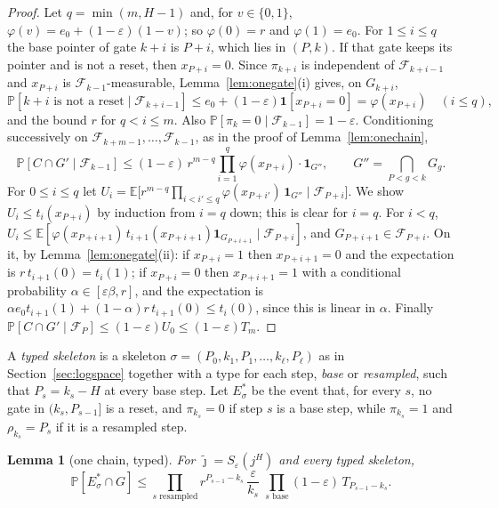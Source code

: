 \documentclass[11pt]{amsart}
\newtheorem{lemma}[theorem]{Lemma}
\theoremstyle{definition}
\theoremstyle{remark}
\newcommand{\eps}{\varepsilon}
\newcommand{\jt}{\tilde{\jmath}}
\newcommand{\PP}{\mathbb{P}}
\newcommand{\EE}{\mathbb{E}}
\newcommand{\cF}{\mathcal{F}}
\begin{document}
\begin{proof}
Let $q=\min(m,H-1)$ and, for $v\in\{0,1\}$, $\varphi(v)=e_0+(1-\eps)(1-v)$; so $\varphi(0)=r$ and
$\varphi(1)=e_0$. For $1\le i\le q$ the base pointer of gate $k+i$ is $P+i$, which lies in $(P,k)$.
If that gate keeps its pointer and is not a reset, then $x_{P+i}=0$. Since $\pi_{k+i}$ is independent
of $\cF_{k+i-1}$ and $x_{P+i}$ is $\cF_{k-1}$-measurable, Lemma~\ref{lem:onegate}(i) gives, on
$G_{k+i}$,
\[
\PP[k+i\text{ is not a reset}\mid\cF_{k+i-1}]\le e_0+(1-\eps)\mathbf 1[x_{P+i}=0]=\varphi(x_{P+i})\quad(i\le q),
\]
and the bound $r$ for $q<i\le m$. Also $\PP[\pi_k=0\mid\cF_{k-1}]=1-\eps$. Conditioning
successively on $\cF_{k+m-1},\dots,\cF_{k-1}$, as in the proof of Lemma~\ref{lem:onechain},
\[
\PP[C\cap G'\mid\cF_{k-1}]\le(1-\eps)\,r^{m-q}\prod_{i=1}^{q}\varphi(x_{P+i})\cdot\mathbf 1_{G''},
\qquad G''=\bigcap_{P<g<k}G_g .
\]
For $0\le i\le q$ let $U_i=\EE\bigl[r^{m-q}\prod_{i<i'\le q}\varphi(x_{P+i'})\,\mathbf 1_{G''}\mid\cF_{P+i}\bigr]$.
We show $U_i\le t_i(x_{P+i})$ by induction from $i=q$ down; this is clear for $i=q$. For $i<q$,
$U_i\le\EE[\varphi(x_{P+i+1})\,t_{i+1}(x_{P+i+1})\mathbf 1_{G_{P+i+1}}\mid\cF_{P+i}]$, and
$G_{P+i+1}\in\cF_{P+i}$. On it, by Lemma~\ref{lem:onegate}(ii): if $x_{P+i}=1$ then $x_{P+i+1}=0$
and the expectation is $r\,t_{i+1}(0)=t_i(1)$; if $x_{P+i}=0$ then $x_{P+i+1}=1$ with a conditional
probability $\alpha\in[\eps\beta,r]$, and the expectation is
$\alpha e_0t_{i+1}(1)+(1-\alpha)r\,t_{i+1}(0)\le t_i(0)$, since this is linear in $\alpha$. Finally
$\PP[C\cap G'\mid\cF_P]\le(1-\eps)U_0\le(1-\eps)T_m$.
\end{proof}

A \emph{typed skeleton} is a skeleton $\sigma=(P_0,k_1,P_1,\dots,k_\ell,P_\ell)$ as in
Section~\ref{sec:logspace} together with a type for each step, \emph{base} or \emph{resampled},
such that $P_s=k_s-H$ at every base step. Let $E^*_\sigma$ be the event that, for every $s$, no
gate in $(k_s,P_{s-1}]$ is a reset, and $\pi_{k_s}=0$ if step $s$ is a base step, while
$\pi_{k_s}=1$ and $\rho_{k_s}=P_s$ if it is a resampled step.

\begin{lemma}[one chain, typed]\label{lem:typed}
For $\jt=S_\eps(j^H)$ and every typed skeleton,
\[
\PP[E^*_\sigma\cap G]\le\prod_{s\text{ resampled}}r^{P_{s-1}-k_s}\,\frac{\eps}{k_s}\;
\prod_{s\text{ base}}(1-\eps)\,T_{P_{s-1}-k_s}.
\]
\end{lemma}
\end{document}
